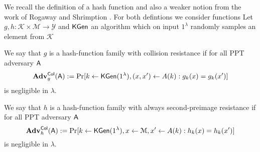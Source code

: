 We recall the definition of a hash function and also a weaker notion from the work of Rogaway and Shrimption \cite{FSE:RogShr04}. For both defintions we consider functions Let $g,h:\mathcal{K}\times\mathcal{M}\to\mathcal{Y}$ and $\mathsf{KGen}$ an algorithm which on input $1^\lambda$ randomly samples an element from $\mathcal{K}$

\begin{definition}\label{def:hash1}
 We say that $g$ is a hash-function family with collision resistance if for all PPT adversary $\mathsf{A}$
$$
\mathbf{Adv}_g^{\mathsf{Col}}(\mathsf{A}) := \Pr[k\gets\mathsf{KGen}(1^\lambda), (x,x')\gets A(k):g_k(x)=g_k(x')]
$$ 
is negligible in $\lambda$.
\end{definition}

\begin{definition}\label{def:hash2}
 We say that $h$ is a hash-function family with always second-preimage resistance if for all PPT adversary $\mathsf{A}$
$$
\mathbf{Adv}_h^{\mathsf{Col}}(\mathsf{A}) := \Pr[k\gets\mathsf{KGen}(1^\lambda), x\gets\mathcal{M}, x'\gets A(k):h_k(x)=h_k(x')]
$$ 
is negligible in $\lambda$.
\end{definition}